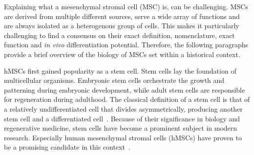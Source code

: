 



%
\label{sec:intro_hMSCs}%
Explaining what a mesenchymal stromal cell (MSC) is, can be challenging. MSCs
are derived from multiple different sources, serve a wide array of functions and
are always isolated as a heterogenous group of cells. This makes it particularly
challenging to find a consensus on their exact definition, nomenclature, exact
function and \textit{in vivo} differentiation potential. Therefore, the
following paragraphs provide a brief overview of the biology of MSCs set within
a historical context.

hMSCs first gained popularity as a stem cell. Stem cells lay the foundation of
multicellular organisms. Embryonic stem cells orchestrate the growth and
patterning during embryonic development, while adult stem cells are responsible
for regeneration during adulthood. The classical definition of a stem cell is
that of a relatively undifferentiated cell that divides asymmetrically,
producing another stem cell and a differentiated
cell~\cite{cooperCellMolecularApproach2000, shenghuiMechanismsStemCell2009}.
Because of their significance in biology and regenerative medicine, stem cells
have become a prominent subject in modern research. Especially human mesenchymal
stromal cells (hMSCs) have proven to be a promising candidate in this
context~\cite{ullahHumanMesenchymalStem2015}.


